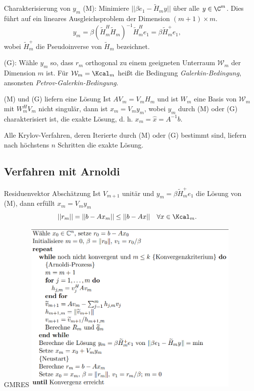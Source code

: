 \begin{karte}{Charakterisierung von \(y_m\)}
    (M): Minimiere \( ||\beta e_1 - \tilde{H}_m y|| \) über alle \(y \in \C^m\). 
    Dies führt auf ein lineares Ausgleichsproblem der Dimension \((m+1)\times m\). 
    \[ y_m = \beta (\tilde{H}_m^H \tilde{H}_m)^{-1} \tilde{H}_m^H e_1 = \beta \tilde{H}_m^+ e_1, \]
    wobei \( \tilde{H}_m^+ \) die Pseudoinverse von \( \tilde{H}_m \) bezeichnet.

    (G): Wähle \(y_m\) so, dass \(r_m\) orthogonal zu einem geeigneten Unterraum 
    \( \mathcal{W}_m \) der Dimension \(m\) ist. Für \( \mathcal{W}_m = \Kcal_m \)
    heißt die Bedingung \textit{Galerkin-Bedingung}, ansonsten \textit{Petrov-Galerkin-Bedingung}.
\end{karte}

\begin{karte}{(M) und (G) liefern eine Lösung}
    Ist \(A V_m = V_m H_m\) und ist \(W_m\) eine Basis von 
    \( \mathcal{W}_m \) mit \(W_m^H V_m\) nicht singulär, dann 
    ist \( x_m = V_m y_m \), wobei \(y_m\) durch (M) oder (G) charakterisiert ist, 
    die exakte Lösung, d. h. \( x_m = \widehat{x} = A^{-1}b \).

    Alle Krylov-Verfahren, deren Iterierte durch (M) oder (G) 
    bestimmt sind, liefern nach höchstens \(n\) Schritten die exakte Lösung.
\end{karte}

\subsection{Verfahren mit Arnoldi}

\begin{karte}{Residuenvektor Abschätzung}
    Ist \( V_{m+1} \) unitär und \(y_m = \beta \tilde{H}_m^+ e_1\) die Lösung 
    von (M), dann erfüllt \( x_m = V_m y_m \)
    \[ ||r_m|| = ||b - A x_m|| \leq ||b - Ax|| \quad \forall x\in \Kcal_m. \]
\end{karte}

\begin{karte}{GMRES}
    \includegraphics[width=0.8\textwidth]{GMRES.png}
\end{karte}

